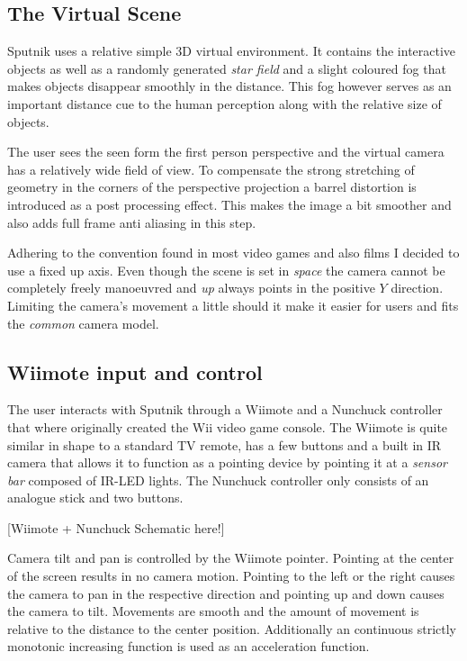 \documentclass[10pt,a4paper]{scrartcl}
\begin{document}
\subsection{The Virtual Scene}
Sputnik uses a relative simple 3D virtual environment. It contains the interactive objects as well as a randomly generated \emph{star field} and a slight coloured fog that makes objects disappear smoothly in the distance. This fog however serves as an important distance cue to the human perception along with the relative size of objects. 

The user sees the seen form the first person perspective and the virtual camera has a relatively wide field of view. To compensate the strong stretching of geometry in the corners of the perspective projection a barrel distortion is introduced as a post processing effect. This makes the image a bit smoother and also adds full frame anti aliasing in this step.

Adhering to the convention found in most video games and also films I decided to use a fixed up axis. Even though the scene is set in \emph{space} the camera cannot be completely freely manoeuvred and \emph{up} always points in the positive $Y$ direction. Limiting the camera's movement a little should it make it easier for users and fits the \emph{common} camera model.


\subsection{Wiimote input and control}

The user interacts with Sputnik through a Wiimote and a Nunchuck controller that where originally created the Wii video game console. The Wiimote is quite similar in shape to a standard TV remote, has a few buttons and a built in IR camera that allows it to function as a pointing device by pointing it at a \emph{sensor bar} composed of IR-LED lights. The Nunchuck controller only consists of an analogue stick and two buttons. 

[Wiimote + Nunchuck Schematic here!]

Camera tilt and pan is controlled by the Wiimote pointer. Pointing at the center of the screen results in no camera motion. Pointing to the left or the right causes the camera to pan in the respective direction and pointing up and down causes the camera to tilt. Movements are smooth and the amount of movement is relative to the distance to the center position. Additionally an continuous strictly monotonic increasing function is used as an acceleration function.
\end{document}
